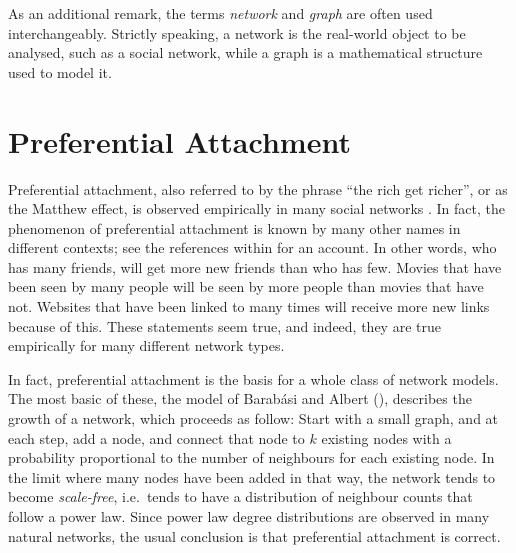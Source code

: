 \documentclass{jimis-final-en}
\begin{document}
As an additional remark, the terms \emph{network} and \emph{graph} are often used
interchangeably.  Strictly speaking, a network is the real-world object
to be analysed, such as a social network, while a graph is a
mathematical structure used to model it.   

\section{Preferential Attachment}
Preferential attachment, also referred to by the phrase ``the rich get
richer'', or as the Matthew effect, is observed empirically in many
social networks \citep{kunegis:preferential-attachment}.  In fact, the
phenomenon of preferential attachment is known by many other names in
different contexts; see the references within
\citep{kunegis:preferential-attachment} for an account.  In other words,
who has many friends, will get more new friends than who has few.
Movies that have been seen by many people will be seen by more people
than movies that have not.  Websites that have been linked to many times
will receive more new links because of this.  These statements seem
true, and indeed, they are true empirically for many different network
types.

In fact, preferential attachment is the basis for a whole class of
network models.  The most basic of these, the model of
Barabási and Albert (\citeyear{b439}), describes the
growth of a network, which proceeds
as follow:  Start with a small graph, and at each step, add a node, and
connect that node to $k$ existing nodes with a probability proportional
to the number of neighbours for each existing node.  In the limit where
many nodes have been added in that way, the network tends to become
\emph{scale-free}, i.e.\ tends to have a distribution of neighbour counts
that follow a power law.  Since power law degree
distributions are observed in many natural networks, the usual conclusion
is that preferential attachment is correct. 
\end{document}
